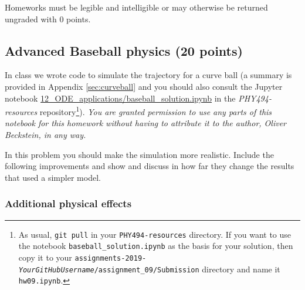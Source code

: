 \documentclass[letterpaper]{scrartcl}
\newcommand{\anumber}{9}
\newcommand{\anum}{0\anumber}
\begin{document}
Homeworks must be legible and intelligible or may otherwise be
returned ungraded with 0 points.




\subsection{Advanced Baseball physics (20 points)}
\label{sec:advanced}

In class we wrote code to simulate the trajectory for a curve ball (a
summary is provided in Appendix \ref{sec:curveball} and you should
also consult the Jupyter notebook
\href{https://github.com/ASU-CompMethodsPhysics-PHY494/PHY494-resources/blob/master/12_ODE_applications/baseball_solution.ipynb}{12\_ODE\_applications/baseball\_solution.ipynb}
in the \emph{PHY494-resources} repository\footnote{As usual,
  \texttt{git pull} in your \texttt{PHY494-resources} directory. If
  you want to use the notebook \texttt{baseball\_solution.ipynb} as
  the basis for your solution, then copy it to your
  \texttt{assignments-2019-\emph{YourGitHubUsername}/assignment\_\anum/Submission}
  directory and name it \texttt{hw09.ipynb}.}). \emph{You are granted
  permission to use any parts of this notebook for this homework
  without having to attribute it to the author, Oliver Beckstein, in
  any way.}

In this problem you should make the simulation more realistic. Include
the following improvements and show and discuss in how far they change
the results that used a simpler model.

\subsubsection{Additional physical effects}
\label{sec:add}
\end{document}
